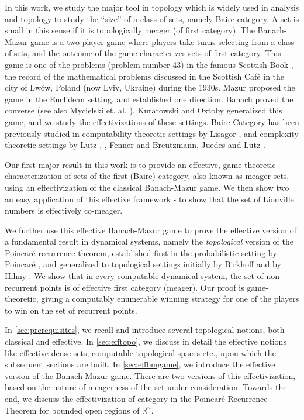 \documentclass[a4paper,UKenglish,autoref,thm-restate,numberwithinsect]{lipics-v2021}
\begin{document}
In this work, we study the major tool in topology which is widely used
in analysis and topology to study the ``size'' of a class of sets,
namely Baire category. A set is small in this sense if it is
topologically meager (of first category). The Banach-Mazur game is a
two-player game where players take turns selecting from a class of
sets, and the outcome of the game characterizes sets of first
category. This game is one of the problems (problem number 43) in the
famous Scottish Book \cite{Mauldin2015}, the record of the
mathematical problems discussed in the Scottish Caf\'{e} in the city
of Lw\'{o}w, Poland (now Lviv, Ukraine) during the 1930s. Mazur
proposed the game in the Euclidean setting, and established one
direction. Banach proved the converse \cite{Banach1930} (see also
Mycielski et. al. \cite{Mycielski1956}). Kuratowski
\cite{Kuratowski1948} and Oxtoby\cite{Oxtoby1957} generalized this
game, and we study the effectivizations of these settings. Baire
Category has been previously studied in computability-theoretic
settings by Lisagor \cite{Lisagor1981}, and complexity theoretic
settings by Lutz \cite{Lutz1987}, \cite{Lutz1992}, Fenner
\cite{Fenner1995} and Breutzmann, Juedes and Lutz
\cite{BreutzmannJuedesLutz2001}.


Our first major result in this work is to provide an effective,
game-theoretic characterization of sets of the first (Baire) category,
also known as meager sets, using an effectivization of the classical
Banach-Mazur game. We then show two an easy application of this
effective framework - to show that the set of Liouville numbers is
effectively co-meager. %


We further use this effective Banach-Mazur game to prove the effective
version of a fundamental result in dynamical systems, namely the
\emph{topological} version of the Poincar\'{e} recurrence theorem,
established first in the probabilistic setting by Poincar\'{e}
\cite{Poincare1899}, and generalized to topological settings initially
by Birkhoff \cite{Birkhoff1927} and by Hilmy \cite{Hilmy1940}. We show
that in every computable dynamical system, the set of non-recurrent
points is of effective first category (meager). Our proof is
game-theoretic, giving a computably enumerable winning strategy for
one of the players to win on the set of recurrent points.

In \cref{sec:prerequisites}, we recall and introduce several
topological notions, both classical and effective. In
\cref{sec:efftopo}, we discuss in detail the effective notions like
effective dense sets, computable topological spaces etc., upon which
the subsequent sections are built. In \cref{sec:effbmgame}, we
introduce the effective version of the Banach-Mazur game. There are
two versions of this effectivization, based on the nature of
meagerness of the set under consideration. Towards the end, we discuss
the effectivization of category in the Poincar\'e Recurrence Theorem
for bounded open regions of $\mathbb{R}^n$.
\end{document}
